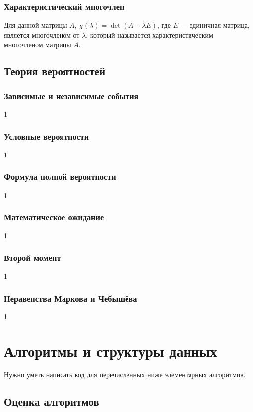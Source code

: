 \documentclass[12pt]{matmex-diploma}
\begin{document}
        \subsubsection*{Характеристический многочлен}
            Для данной матрицы $A$, $\chi (\lambda )=\det(A-\lambda E)$, где $E$ — единичная матрица, является многочленом от $\lambda$, который называется характеристическим многочленом матрицы $A$.
    
    \subsection{Теория вероятностей}
    
        \subsubsection*{Зависимые и независимые события}
            1
        \subsubsection*{Условные вероятности}
            1
        \subsubsection*{Формула полной вероятности}
            1
        \subsubsection*{Математическое ожидание}
            1
        \subsubsection*{Второй момент}
            1
        \subsubsection*{Неравенства Маркова и Чебышёва}
            1
            
\section{Алгоритмы и структуры данных}

    Нужно уметь написать код для перечисленных ниже элементарных алгоритмов.

    \subsection{Оценка алгоритмов}
    
\end{document}
